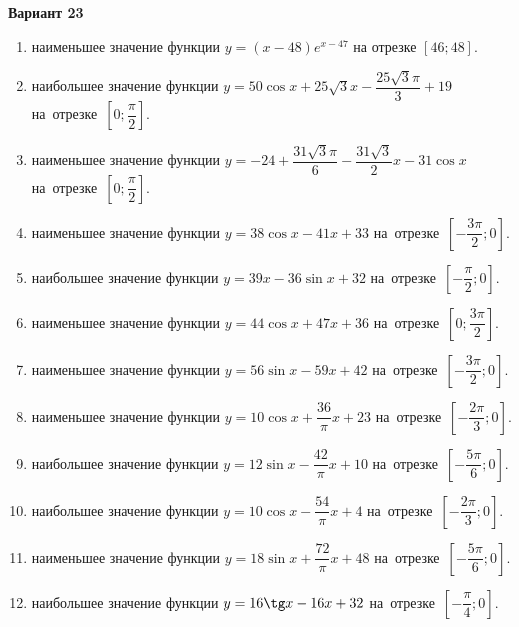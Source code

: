 \documentclass[a4paper,10pt]{article}
\begin{document}
\begin{center}\Large\textbf{Вариант 23}\end{center}

\begin{enumerate}
\item {} наименьшее значение функции $y = \left(x-48\right)e^{x-47}$ на отрезке $\left[46;48\right]$.

\item {} наибольшее значение функции $y = 50\cos x+25\sqrt{3}x-\dfrac{25\sqrt{3}\pi}{3} +19$ на~отрезке~$\left[0;\dfrac{\pi }{2}\right]$.

\item {} наименьшее значение функции $y = -24+\dfrac{31\sqrt{3} \pi}{6}-\dfrac{31\sqrt{3}}{2}x-31\cos x$ на~отрезке~$\left[0;\dfrac{\pi }{2}\right]$.

\item {} наименьшее значение функции $y = 38\cos x-41x+33$ на~отрезке~$\left[-\dfrac{3\pi }{2};0\right]$.

\item {} наибольшее значение функции $y = 39x-36\sin x+32$ на~отрезке~$\left[-\dfrac{\pi }{2};0\right]$.

\item {} наименьшее значение функции $y = 44\cos x+47x+36$ на~отрезке~$\left[0;\dfrac{3\pi }{2}\right]$.

\item {} наименьшее значение функции $y = 56\sin x-59x+42$ на~отрезке~$\left[-\dfrac{3\pi }{2};0\right]$.

\item {} наименьшее значение функции $y = 10\cos x+\dfrac{36}{\pi }x +23$ на~отрезке~$\left[-\dfrac{2\pi }{3};0\right]$.

\item {} наибольшее значение функции $y = 12\sin x-\dfrac{42}{\pi }x+10$ на~отрезке~$\left[-\dfrac{5\pi }{6};0\right]$.

\item {} наибольшее значение функции $y = 10\cos x-\dfrac{54}{\pi }x+4$ на~отрезке~$\left[-\dfrac{2\pi }{3};0\right]$.

\item {} наименьшее значение функции $y = 18\sin x+\dfrac{72}{\pi }x+48$ на~отрезке~$\left[-\dfrac{5\pi }{6};0\right]$.

\item {} наибольшее значение функции $y = 16\tg x-16x+32$ на~отрезке~$\left[-\dfrac{\pi }{4};0\right]$.


\end{enumerate}
\end{document}
